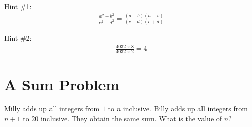 \documentclass[12pt]{article}
\begin{document}
\begin{answer}
Hint \#1:
\begin{align*}
\frac{a^2 - b^2}{c^2 - d^2}
= \frac{(a-b)(a+b)}{(c-d)(c+d)}
\end{align*}

Hint \#2:
\begin{align*}
\frac{4032 \times 8}{4032 \times 2} = 4 
\end{align*}
\end{answer}

\section{A Sum Problem}
Milly adds up all integers from $1$ to $n$ inclusive.
Billy adds up all integers from $n+1$ to $20$ inclusive.
They obtain the same sum. What is the value of $n$?
\end{document}
